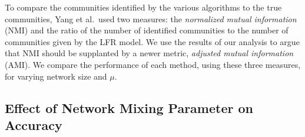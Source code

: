 To compare the communities identified by the various algorithms to the true communities, Yang et al.\ used two measures:  the \emph{normalized mutual information} (NMI) and the ratio of the number of identified communities to the number of communities given by the LFR model. We use the results of our analysis to argue that NMI should be supplanted by a newer metric, \emph{adjusted mutual information} (AMI). We compare the performance of each method, using these three measures, for varying network size and $\mu$.



\subsection{Effect of Network Mixing Parameter on Accuracy}

\begin{figure}
  \centering


\end{figure}
